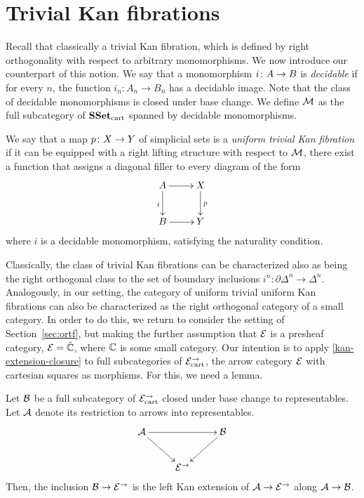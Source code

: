 \documentclass[reqno,10pt,a4paper,oneside]{amsart}
\begin{document}
\section{Trivial Kan fibrations}

Recall that classically a trivial Kan fibration, which is defined by right orthogonality with respect to arbitrary monomorphisms. We now introduce our counterpart of this notion. We say that a monomorphism 
$i \co A \to B$ is  \emph{decidable} if for every $n$, the function $i_n : A_n \to B_n$ has a decidable image. 
Note that the class of decidable monomorphisms is closed under base change. We define $\cal{M}$ as the full subcategory of $\SSet_\cart$ spanned by decidable monomorphisms. 

\begin{definition} We say that a map $p \co X \to Y$ of simplicial sets is a \emph{uniform trivial Kan fibration}
 if it can be equipped with a right lifting structure with respect to $\cal{M}$, \ie there exist a function that 
 assigns a diagonal filler to every diagram of the form
 \[
 \xymatrix{
 A \ar[r] \ar[d]_i & X \ar[d]^p \\
 B \ar[r] & Y}
 \]
 where $i$ is a decidable monomorphism, satisfying the naturality condition. 
 \end{definition} 
 
 Classically, the class of trivial Kan fibrations can be characterized also as being the right orthogonal class to the
set of boundary inclusions $i^n : \partial \Delta^n \to \Delta^n$. Analogously, in our setting, the category of uniform trivial uniform
Kan fibrations can also be characterized as the right orthogonal category of  a small category.
In order to do this, we return to consider the setting of Section~\ref{sec:ortf}, but making the
further assumption that $\catE$ is a presheaf category, \ie $\catE = \hat{\cat{C}}$, where $\catC$ is some small category. Our intention is to apply \cref{kan-extension-closure} to full subcategories of $\catE_{\cart}^{\to}$, the arrow category $\catE$ with cartesian squares as morphisms. For this, we need a lemma.

\begin{lemma}
\label{left-kan-extension-of-representables}
Let $\cal{B}$ be a full subcategory of $\catE_{\cart}^{\to}$ closed under base change to representables.
Let $\cal{A}$ denote its restriction to arrows into representables.
\[
\xymatrix{
  \cal{A}
  \ar[rr]
  \ar[dr]
&&
  \cal{B}
  \ar[dl]
\\&
  \catE^{\to}
}
\]
Then, the inclusion $\cal{B} \to \catE^{\to}$ is the left Kan extension of $\cal{A} \to \catE^{\to}$ along $\cal{A} \to \cal{B}$.
\end{lemma}
\end{document}
